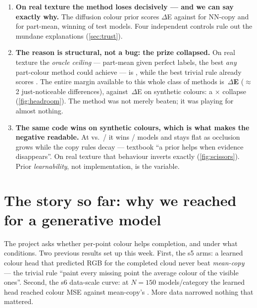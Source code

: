 \documentclass[11pt]{article}
\begin{document}
\reportheader

\begin{tldr}
\begin{enumerate}
  \item \textbf{On real texture the method loses decisively --- and we can say exactly why.}
  The diffusion colour prior scores \dERRPMid{} $\Delta$E against \dERNNMid{} for NN-copy and
  \dERPMMid{} for part-mean, winning \winR{} of \winNR{} test models. Four independent controls
  rule out the mundane explanations (\cref{sec:trust}).
  \item \textbf{The reason is structural, not a bug: the prize collapsed.} On real texture the
  \emph{oracle ceiling} --- part-mean given perfect labels, the best \emph{any} part-colour
  method could achieve --- is \dEROCMid, while the best trivial rule already scores
  \dERNNMid. The entire margin available to this whole class of methods is
  \textbf{\hdrmR\,$\Delta$E} ($\approx$2 just-noticeable differences), against \hdrmS\,$\Delta$E
  on synthetic colours: a \hdrmRatio$\times$ collapse (\cref{fig:headroom}). The method was not
  merely beaten; it was playing for almost nothing.
  \item \textbf{The same code wins on synthetic colours, which is what makes the negative
  readable.} At \dESRPMid{} vs.\ \dESPMMid/\dESNNMid{} it wins \winS/\winNS{} models and stays
  flat as occlusion grows while the copy rules decay --- textbook ``a prior helps when
  evidence disappears''. On real texture that behaviour inverts exactly
  (\cref{fig:scissors}). Prior \emph{learnability}, not implementation, is the variable.
\end{enumerate}
\end{tldr}

\section{The story so far: why we reached for a generative model}\label{sec:story}

The project asks whether per-point colour helps completion, and under what conditions. Two
previous results set up this week. First, the s5 arms: a learned colour head that predicted
RGB for the completed cloud never beat \emph{mean-copy} --- the trivial rule ``paint every
missing point the average colour of the visible ones''. Second, the s6 data-scale curve: at
$N{=}150$ models/category the learned head reached \sixLearned{} colour MSE against
mean-copy's \sixMean. More data narrowed nothing that mattered.
\end{document}
